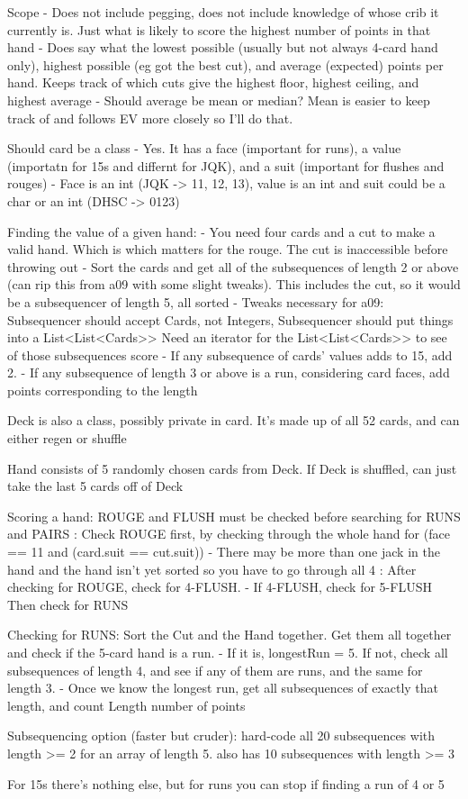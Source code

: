 Scope - Does not include pegging, does not include knowledge of whose crib it currently is. 
        Just what is likely to score the highest number of points in that hand
      - Does say what the lowest possible (usually but not always 4-card hand only), highest possible (eg got the best cut), and average (expected) points per hand. 
        Keeps track of which cuts give the highest floor, highest ceiling, and highest average
      - Should average be mean or median? Mean is easier to keep track of and follows EV more closely so I'll do that. 


Should card be a class
 - Yes. It has a face (important for runs), a value (importatn for 15s and differnt for JQK), and a suit (important for flushes and rouges)
 - Face is an int (JQK -> 11, 12, 13), value is an int and suit could be a char or an int (DHSC -> 0123)

Finding the value of a given hand:
 - You need four cards and a cut to make a valid hand. Which is which matters for the rouge. The cut is inaccessible before throwing out
 - Sort the cards and get all of the subsequences of length 2 or above (can rip this from a09 with some slight tweaks). 
        This includes the cut, so it would be a subsequencer of length 5, all sorted
 - Tweaks necessary for a09: Subsequencer should accept Cards, not Integers, Subsequencer should put things into a List<List<Cards>>
        Need an iterator for the List<List<Cards>> to see of those subsequences score
 - If any subsequence of cards' values adds to 15, add 2.
 - If any subsequence of length 3 or above is a run, considering card faces, add points corresponding to the length

Deck is also a class, possibly private in card. It's made up of all 52 cards, and can either regen or shuffle

Hand consists of 5 randomly chosen cards from Deck. If Deck is shuffled, can just take the last 5 cards off of Deck

Scoring a hand: ROUGE and FLUSH must be checked before searching for RUNS and PAIRS
              : Check ROUGE first, by checking through the whole hand for (face == 11 and (card.suit == cut.suit))
                    - There may be more than one jack in the hand and the hand isn't yet sorted so you have to go through all 4
              : After checking for ROUGE, check for 4-FLUSH. 
                    - If 4-FLUSH, check for 5-FLUSH
              Then check for RUNS

Checking for RUNS: Sort the Cut and the Hand together. Get them all together and check if the 5-card hand is a run.
                   - If it is, longestRun = 5. If not, check all subsequences of length 4, and see if any of them are runs, and the same for length 3. 
                   - Once we know the longest run, get all subsequences of exactly that length, and count Length number of points 

Subsequencing option (faster but cruder): hard-code all 20 subsequences with length >= 2 for an array of length 5.
                                          also has 10 subsequences with length >= 3
                                          
For 15s there's nothing else, but for runs you can stop if finding a run of 4 or 5
